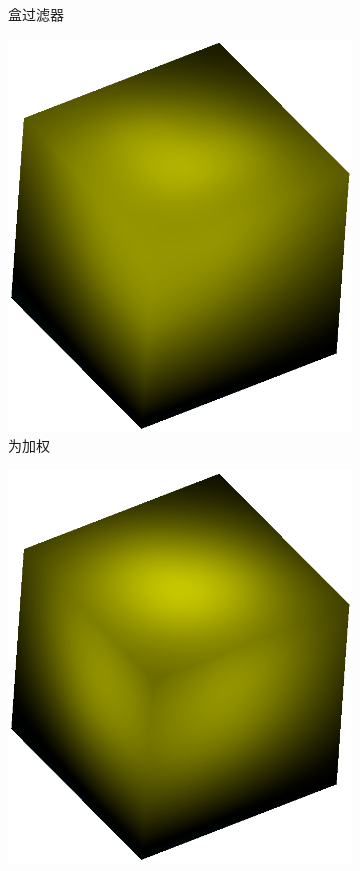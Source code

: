 \begin{figure}
\begin{fullwidth}
\begin{subfigure}[b]{0.245\thewidth}
			\caption{盒过滤器}
	\end{subfigure}
	\begin{subfigure}[b]{0.245\thewidth}
		\includegraphics[width=\textwidth]{figures/pl/reconstruction-unweighted}
			\caption{为加权}
	\end{subfigure}
	\begin{subfigure}[b]{0.245\thewidth}
		\includegraphics[width=\textwidth]{figures/pl/reconstruction-weighted}

\end{subfigure}
\end{fullwidth}
\end{figure}
